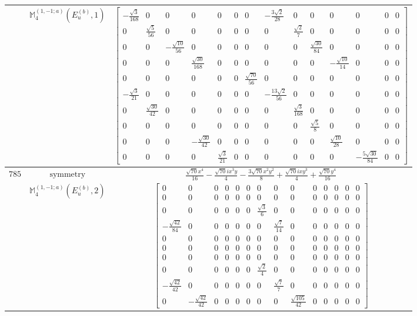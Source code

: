 \documentclass[fleqn,8pt,landscape]{jsarticle}
\begin{document}
\begin{longtable}{ccc}
$  $ & $ \mathbb{M}_{4}^{(1,-1;a)}(E_{u}^{(b)},1) $ & $ \begin{bmatrix} - \frac{\sqrt{3}}{168} & 0 & 0 & 0 & 0 & 0 & 0 & - \frac{3 \sqrt{2}}{28} & 0 & 0 & 0 & 0 & 0 & 0 \\ 0 & \frac{\sqrt{5}}{56} & 0 & 0 & 0 & 0 & 0 & 0 & \frac{\sqrt{2}}{7} & 0 & 0 & 0 & 0 & 0 \\ 0 & 0 & - \frac{\sqrt{10}}{56} & 0 & 0 & 0 & 0 & 0 & 0 & \frac{\sqrt{30}}{84} & 0 & 0 & 0 & 0 \\ 0 & 0 & 0 & \frac{\sqrt{30}}{168} & 0 & 0 & 0 & 0 & 0 & 0 & - \frac{\sqrt{10}}{14} & 0 & 0 & 0 \\ 0 & 0 & 0 & 0 & 0 & 0 & \frac{\sqrt{70}}{56} & 0 & 0 & 0 & 0 & 0 & 0 & 0 \\ - \frac{\sqrt{3}}{21} & 0 & 0 & 0 & 0 & 0 & 0 & - \frac{13 \sqrt{2}}{56} & 0 & 0 & 0 & 0 & 0 & 0 \\ 0 & \frac{\sqrt{30}}{42} & 0 & 0 & 0 & 0 & 0 & 0 & \frac{\sqrt{3}}{168} & 0 & 0 & 0 & 0 & 0 \\ 0 & 0 & 0 & 0 & 0 & 0 & 0 & 0 & 0 & \frac{\sqrt{5}}{8} & 0 & 0 & 0 & 0 \\ 0 & 0 & 0 & - \frac{\sqrt{30}}{42} & 0 & 0 & 0 & 0 & 0 & 0 & \frac{\sqrt{10}}{28} & 0 & 0 & 0 \\ 0 & 0 & 0 & 0 & \frac{\sqrt{3}}{21} & 0 & 0 & 0 & 0 & 0 & 0 & - \frac{5 \sqrt{30}}{84} & 0 & 0 \end{bmatrix} $ \\ \hline
$ 785 $ & $ \text{symmetry} $ & $ \frac{\sqrt{70} x^{4}}{16} - \frac{\sqrt{70} i x^{3} y}{4} - \frac{3 \sqrt{70} x^{2} y^{2}}{8} + \frac{\sqrt{70} i x y^{3}}{4} + \frac{\sqrt{70} y^{4}}{16} $ \\
$  $ & $ \mathbb{M}_{4}^{(1,-1;a)}(E_{u}^{(b)},2) $ & $ \begin{bmatrix} 0 & 0 & 0 & 0 & 0 & 0 & 0 & 0 & 0 & 0 & 0 & 0 & 0 & 0 \\ 0 & 0 & 0 & 0 & 0 & 0 & 0 & 0 & 0 & 0 & 0 & 0 & 0 & 0 \\ 0 & 0 & 0 & 0 & 0 & 0 & \frac{\sqrt{3}}{6} & 0 & 0 & 0 & 0 & 0 & 0 & 0 \\ - \frac{\sqrt{42}}{84} & 0 & 0 & 0 & 0 & 0 & 0 & \frac{\sqrt{7}}{14} & 0 & 0 & 0 & 0 & 0 & 0 \\ 0 & 0 & 0 & 0 & 0 & 0 & 0 & 0 & 0 & 0 & 0 & 0 & 0 & 0 \\ 0 & 0 & 0 & 0 & 0 & 0 & 0 & 0 & 0 & 0 & 0 & 0 & 0 & 0 \\ 0 & 0 & 0 & 0 & 0 & 0 & 0 & 0 & 0 & 0 & 0 & 0 & 0 & 0 \\ 0 & 0 & 0 & 0 & 0 & 0 & \frac{\sqrt{2}}{4} & 0 & 0 & 0 & 0 & 0 & 0 & 0 \\ - \frac{\sqrt{42}}{42} & 0 & 0 & 0 & 0 & 0 & 0 & \frac{\sqrt{7}}{7} & 0 & 0 & 0 & 0 & 0 & 0 \\ 0 & - \frac{\sqrt{42}}{42} & 0 & 0 & 0 & 0 & 0 & 0 & \frac{\sqrt{105}}{42} & 0 & 0 & 0 & 0 & 0 \end{bmatrix} $ \\ \hline

\end{longtable}
\end{document}
